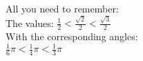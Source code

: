 \documentclass[preview]{standalone}
\begin{document}
\begin{center}
All you need to remember: \\ The values: $ \frac{1}{2} < \frac{\sqrt{2}}{2} < \frac{\sqrt{3}}{2} $ \\ With the corresponding angles: \\ $ \frac{1}{6} \pi < \frac{1}{4} \pi < \frac{1}{3} \pi $
\end{center}
\end{document}
